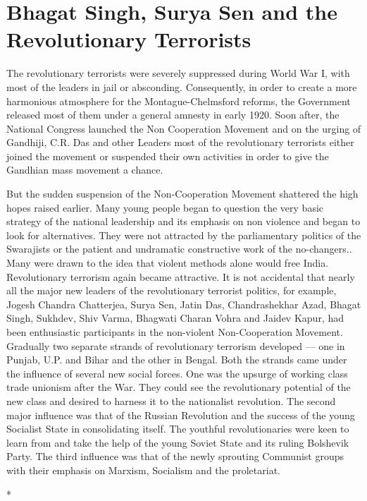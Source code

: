 \chapter[The Revolutionary Terrorist]{Bhagat Singh, Surya Sen and the Revolutionary Terrorists}

The revolutionary terrorists were severely suppressed during World War I, with most of the leaders in jail or absconding. Consequently, in order to create a more harmonious atmosphere for the Montague-Chelmsford reforms, the Government released most of them under a general amnesty in early 1920. Soon after, the National Congress launched the Non Cooperation Movement and on the urging of Gandhiji, C.R. Das and other Leaders most of the revolutionary terrorists either joined the movement or suspended their own activities in order to give the Gandhian mass movement a chance.

But the sudden suspension of the Non-Cooperation Movement shattered the high hopes raised earlier. Many young people began to question the very basic strategy of the national leadership and its emphasis on non violence and began to look for alternatives. They were not attracted by the parliamentary politics of the Swarajists or the patient and undramatic constructive work of the no-changers.. Many were drawn to the idea that violent methods alone would free India. Revolutionary terrorism again became attractive. It is not accidental that nearly all the major new leaders of the revolutionary terrorist politics, for example, Jogesh Chandra Chatterjea, Surya Sen, Jatin Das, Chandrashekhar Azad, Bhagat Singh, Sukhdev, Shiv Varma, Bhagwati Charan Vohra and Jaidev Kapur, had been enthusiastic participants in the non-violent Non-Cooperation Movement. Gradually two separate strands of revolutionary terrorism developed --- one in Punjab, U.P. and Bihar and the other in Bengal. Both the strands came under the influence of several new social forces. One was the upsurge of working class trade unionism after the War. They could see the revolutionary potential of the new class and desired to harness it to the nationalist revolution. The second major influence was that of the Russian Revolution and the success of the young Socialist State in consolidating itself. The youthful revolutionaries were keen to learn from and take the help of the young Soviet State and its ruling Bolshevik Party. The third influence was that of the newly sprouting Communist groups with their emphasis on Marxism, Socialism and the proletariat.

\begin{center}*\end{center}


